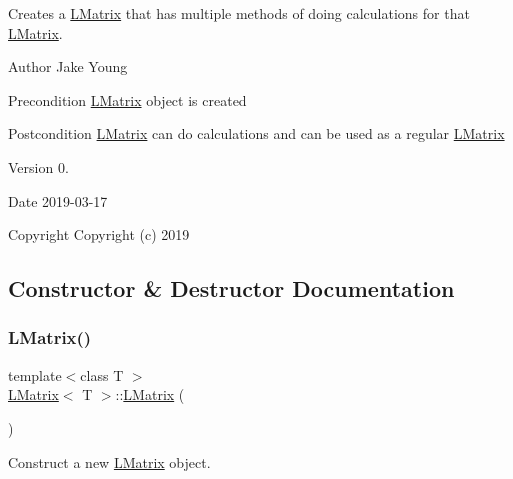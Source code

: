 Creates a \mbox{\hyperlink{class_l_matrix}{L\+Matrix}} that has multiple methods of doing calculations for that \mbox{\hyperlink{class_l_matrix}{L\+Matrix}}. 

\begin{DoxyAuthor}{Author}
Jake Young 
\end{DoxyAuthor}
\begin{DoxyPrecond}{Precondition}
\mbox{\hyperlink{class_l_matrix}{L\+Matrix}} object is created 
\end{DoxyPrecond}
\begin{DoxyPostcond}{Postcondition}
\mbox{\hyperlink{class_l_matrix}{L\+Matrix}} can do calculations and can be used as a regular \mbox{\hyperlink{class_l_matrix}{L\+Matrix}} 
\end{DoxyPostcond}
\begin{DoxyVersion}{Version}
0. 
\end{DoxyVersion}
\begin{DoxyDate}{Date}
2019-\/03-\/17
\end{DoxyDate}
\begin{DoxyCopyright}{Copyright}
Copyright (c) 2019 
\end{DoxyCopyright}


\subsection{Constructor \& Destructor Documentation}
\mbox{\label{class_l_matrix_ae3c54a6ef307ad2e570db483b9fd9c03}} 
\subsubsection{\texorpdfstring{LMatrix()}{LMatrix()}\hspace{0.1cm}{\footnotesize\ttfamily [1/5]}}
{\footnotesize\ttfamily template$<$class T $>$ \\
\mbox{\hyperlink{class_l_matrix}{L\+Matrix}}$<$ T $>$\+::\mbox{\hyperlink{class_l_matrix}{L\+Matrix}} (\begin{DoxyParamCaption}{ }\end{DoxyParamCaption})}



Construct a new \mbox{\hyperlink{class_l_matrix}{L\+Matrix}} object. 

\mbox{\label{class_l_matrix_a5e031d95fcb4ce79894c52488d224f98}} 
